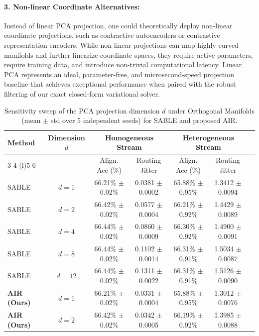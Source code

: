 \documentclass{article}
\theoremstyle{plain}
\theoremstyle{definition}
\theoremstyle{remark}
\begin{document}
\paragraph{3. Non-linear Coordinate Alternatives:}
Instead of linear PCA projection, one could theoretically deploy non-linear coordinate projections, such as contractive autoencoders or contrastive representation encoders. While non-linear projections can map highly curved manifolds and further linearize coordinate spaces, they require active parameters, require training data, and introduce non-trivial computational latency. Linear PCA represents an ideal, parameter-free, and microsecond-speed projection baseline that achieves exceptional performance when paired with the robust filtering of our exact closed-form variational solver.

\begin{table}[h]
\caption{Sensitivity sweep of the PCA projection dimension $d$ under Orthogonal Manifolds (mean $\pm$ std over 5 independent seeds) for SABLE and proposed AIR.}
\label{tab:pca_sensitivity}
\vskip 0.1in
\begin{center}
\begin{small}
\begin{sc}
\begin{tabular}{lcccccc}
\toprule
Method & Dimension $d$ & \multicolumn{2}{c}{Homogeneous Stream} & \multicolumn{2}{c}{Heterogeneous Stream} \\
\cmidrule(r){3-4} \cmidrule(l){5-6}
& & Align. Acc (\%) & Routing Jitter & Align. Acc (\%) & Routing Jitter \\
\midrule
SABLE & $d=1$ & 66.21\% $\pm$ 0.02\% & 0.0381 $\pm$ 0.0002 & 65.88\% $\pm$ 0.95\% & 1.3412 $\pm$ 0.0094 \\
SABLE & $d=2$ & 66.42\% $\pm$ 0.02\% & 0.0577 $\pm$ 0.0004 & 66.21\% $\pm$ 0.92\% & 1.4429 $\pm$ 0.0089 \\
SABLE & $d=4$ & 66.44\% $\pm$ 0.02\% & 0.0860 $\pm$ 0.0009 & 66.30\% $\pm$ 0.92\% & 1.4900 $\pm$ 0.0091 \\
SABLE & $d=8$ & 66.44\% $\pm$ 0.02\% & 0.1102 $\pm$ 0.0014 & 66.31\% $\pm$ 0.91\% & 1.5034 $\pm$ 0.0087 \\
SABLE & $d=12$ & 66.44\% $\pm$ 0.02\% & 0.1311 $\pm$ 0.0022 & 66.31\% $\pm$ 0.91\% & 1.5126 $\pm$ 0.0090 \\
\midrule
\textbf{AIR (Ours)} & $d=1$ & 66.21\% $\pm$ 0.02\% & 0.0331 $\pm$ 0.0004 & 65.88\% $\pm$ 0.95\% & 1.3012 $\pm$ 0.0076 \\
\textbf{AIR (Ours)} & $d=2$ & 66.42\% $\pm$ 0.02\% & 0.0342 $\pm$ 0.0005 & 66.19\% $\pm$ 0.92\% & 1.3985 $\pm$ 0.0088 \\

\end{tabular}
\end{sc}
\end{small}
\end{center}
\end{table}
\end{document}
